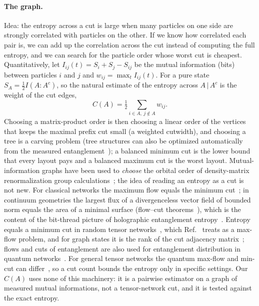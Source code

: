 \paragraph{The graph.}
Idea: the entropy across a cut is large when many particles on one side are strongly correlated with particles on the other. If we know how correlated each pair is, we can add up the correlation across the cut instead of computing the full entropy, and we can search for the particle order whose worst cut is cheapest. Quantitatively, let $I_{ij}(t)=S_i+S_j-S_{ij}$ be the mutual information (bits) between particles $i$ and $j$ and $w_{ij}=\max_tI_{ij}(t)$. For a pure state $S_A=\tfrac12I(A\!:\!A^c)$, so the natural estimate of the entropy across $A\,|\,A^c$ is
the weight of the cut edges,
\begin{equation}
C(A)=\tfrac12\sum_{i\in A,\ j\notin A}w_{ij}.
\label{eq:Cgraph}
\end{equation}
Choosing a matrix-product order is then choosing a linear order of the vertices that keeps the maximal prefix cut small (a weighted cutwidth), and choosing a tree is a carving problem (tree structures can also be optimized automatically from the measured entanglement~\cite{hikihara2023}); a balanced minimum cut is the lower bound that every layout pays and a balanced
maximum cut is the worst layout. Mutual-information graphs have been used to \emph{choose} the orbital order of density-matrix renormalization group
calculations~\cite{rissler2006,barcza2011,szalay2015}; the idea of reading an entropy as a cut is not new. For classical networks the maximum flow equals the minimum cut~\cite{dantzig2003max}; in continuum geometries the largest flux of a divergenceless vector field of bounded norm equals the area of a minimal surface (flow--cut theorems~\cite{headrick2018riemannian}), which is the content of the bit-thread picture of holographic entanglement entropy~\cite{freedman2017}. Entropy equals a minimum cut in random tensor networks~\cite{hayden2016,fitter2025}, which Ref.~\cite{fitter2025} treats as a max-flow problem, and for graph states it is the rank of the cut adjacency matrix~\cite{hein2004}; flows and cuts of entanglement are also used for entanglement distribution in quantum networks~\cite{yang2022strong}.
For general tensor networks the quantum max-flow and min-cut can differ~\cite{cui2016,gesmundo2018}, so a cut count bounds the entropy only in specific settings. Our $C(A)$ uses none of this machinery: it is a pairwise estimator on a graph of measured mutual informations, not a tensor-network cut, and it is tested against the exact entropy.

